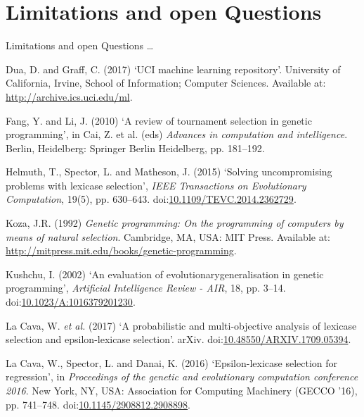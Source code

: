 \documentclass[
  ignorenonframetext,
]{beamer}
\newenvironment{cslreferences}%
  {}%
  {\par}
\begin{document}
\hypertarget{limitations-and-open-questions}{%
\section{Limitations and open
Questions}\label{limitations-and-open-questions}}

\begin{frame}{Limitations and open Questions}
\ldots{} \newpage  

\hypertarget{refs}{}
\begin{cslreferences}
\leavevmode\hypertarget{ref-Dua:2019}{}%
Dua, D. and Graff, C. (2017) `UCI machine learning repository'.
University of California, Irvine, School of Information; Computer
Sciences. Available at: \url{http://archive.ics.uci.edu/ml}.

\leavevmode\hypertarget{ref-10.1007ux2f978-3-642-16493-4_19}{}%
Fang, Y. and Li, J. (2010) `A review of tournament selection in genetic
programming', in Cai, Z. et al. (eds) \emph{Advances in computation and
intelligence}. Berlin, Heidelberg: Springer Berlin Heidelberg, pp.
181--192.

\leavevmode\hypertarget{ref-6920034}{}%
Helmuth, T., Spector, L. and Matheson, J. (2015) `Solving uncompromising
problems with lexicase selection', \emph{IEEE Transactions on
Evolutionary Computation}, 19(5), pp. 630--643.
doi:\href{https://doi.org/10.1109/TEVC.2014.2362729}{10.1109/TEVC.2014.2362729}.

\leavevmode\hypertarget{ref-koza_main}{}%
Koza, J.R. (1992) \emph{Genetic programming: On the programming of
computers by means of natural selection}. Cambridge, MA, USA: MIT Press.
Available at: \url{http://mitpress.mit.edu/books/genetic-programming}.

\leavevmode\hypertarget{ref-generalisation_in_gp}{}%
Kushchu, I. (2002) `An evaluation of evolutionarygeneralisation in
genetic programming', \emph{Artificial Intelligence Review - AIR}, 18,
pp. 3--14.
doi:\href{https://doi.org/10.1023/A:1016379201230}{10.1023/A:1016379201230}.

\leavevmode\hypertarget{ref-https:ux2fux2fdoi.orgux2f10.48550ux2farxiv.1709.05394}{}%
La Cava, W. \emph{et al.} (2017) `A probabilistic and multi-objective
analysis of lexicase selection and epsilon-lexicase selection'. arXiv.
doi:\href{https://doi.org/10.48550/ARXIV.1709.05394}{10.48550/ARXIV.1709.05394}.

\leavevmode\hypertarget{ref-epsilon_lexicase_main}{}%
La Cava, W., Spector, L. and Danai, K. (2016) `Epsilon-lexicase
selection for regression', in \emph{Proceedings of the genetic and
evolutionary computation conference 2016}. New York, NY, USA:
Association for Computing Machinery (GECCO '16), pp. 741--748.
doi:\href{https://doi.org/10.1145/2908812.2908898}{10.1145/2908812.2908898}.


\end{cslreferences}
\end{frame}
\end{document}
